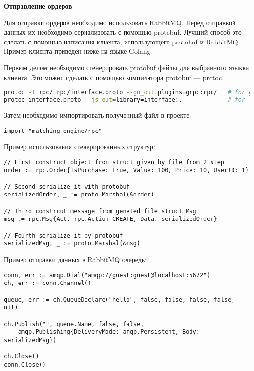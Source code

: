 \textbf{Отправление ордеров}

Для отправки ордеров необходимо использовать RabbitMQ. Перед отправкой данных их необходимо сериализовать с помощью protobuf. Лучший способ это сделать с помощью написания клиента, использующего protobuf и RabbitMQ. Пример клиента приведён ниже на языке Golang.

Первым делом необходимо сгенерировать protobuf файлы для выбранного языкка клиента. Это можно сделать с помощью компилятора protobuf — protoc.

\begin{lstlisting}[language=bash]
protoc -I rpc/ rpc/interface.proto --go_out=plugins=grpc:rpc/   # for golang
protoc interface.proto --js_out=library=interface:.             # for javascript
\end{lstlisting}

Затем необходимо импортировать полученный файл в проекте.

\begin{lstlisting}[language=Golang]
import "matching-engine/rpc"
\end{lstlisting}

Пример использования сгенерированных структур:

\begin{lstlisting}[language=Golang]
// First construct object from struct given by file from 2 step
order := rpc.Order{IsPurchase: true, Value: 100, Price: 10, UserID: 1}

// Second serialize it with protobuf
serializedOrder, _ := proto.Marshal(&order)

// Third constrcut message from geneted file struct Msg
msg := rpc.Msg{Act: rpc.Action_CREATE, Data: serializedOrder}

// Fourth serialize it by protobuf
serializedMsg, _ := proto.Marshal(&msg)
\end{lstlisting}

Пример отправки данных в RabbitMQ очередь:

\begin{lstlisting}[language=Golang]
conn, err := amqp.Dial("amqp://guest:guest@localhost:5672")
ch, err := conn.Channel()

queue, err := ch.QueueDeclare("hello", false, false, false, false, nil)

ch.Publish("", queue.Name, false, false,
    amqp.Publishing{DeliveryMode: amqp.Persistent, Body: serializedMsg})

ch.Close()
conn.Close()
\end{lstlisting}

